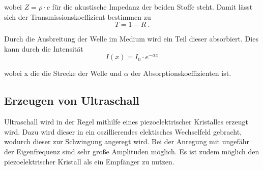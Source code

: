 wobei $Z= \rho \cdot c$ für die akustische Impedanz der beiden Stoffe steht.
Damit lässt sich der Transmissionskoeffizient bestimmen zu
\begin{equation}
  T = 1 - R \ .
  \label{eqn:transmission}
\end{equation}


Durch die Ausbreitung der Welle im Medium wird ein Teil dieser absorbiert. Dies kann durch die Intensität
\begin{equation}
	\label{eqn:daempfung}
	I(x) = I_0 \cdot e^{-\alpha x}
\end{equation}

wobei x die die Strecke der Welle und $\alpha$ der Absorptionskoeffizienten ist.


\subsection{Erzeugen von Ultraschall}

Ultraschall wird in der Regel mithilfe eines piezoelektrischer Kristalles erzeugt wird. Dazu wird dieser in ein oszillierendes elektisches Wechselfeld gebracht, wodurch dieser zur
Schwingung angeregt wird. Bei der Anregung mit ungefähr der Eigenfrequenz sind sehr große Amplituden möglich. Es ist zudem möglich den piezoelektrischer Kristall als ein Empfänger zu nutzen.







